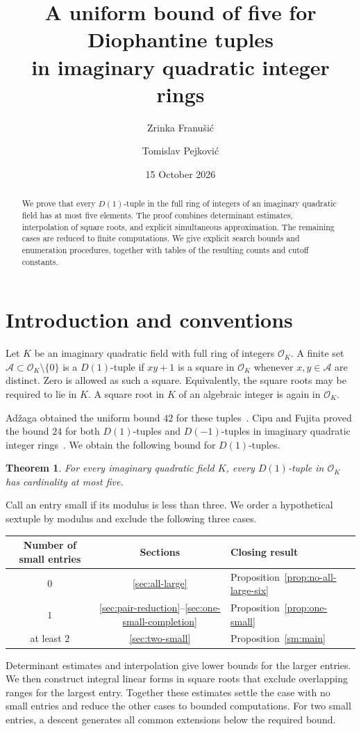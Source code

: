 \documentclass[12pt]{article}
\title{A uniform bound of five for Diophantine tuples\\in imaginary quadratic integer rings}
\author{Zrinka Franu\v{s}i\'{c} \and Tomislav Pejkovi\'{c}}
\date{15 October 2026}
\newtheorem{theorem}{Theorem}[section]
\numberwithin{equation}{section}
\begin{document}
\maketitle
\begin{abstract}
We prove that every $D(1)$-tuple in the full ring of integers of an
imaginary quadratic field has at most five elements. The proof combines
determinant estimates, interpolation of square roots, and explicit
simultaneous approximation. The remaining cases are reduced to finite
computations. We give explicit search bounds and enumeration procedures,
together with tables of the resulting counts and cutoff constants.
\end{abstract}

\section{Introduction and conventions}

Let $K$ be an imaginary quadratic field with full ring of integers
$\mathcal O_K$. A finite set $\mathcal A\subset\mathcal O_K\setminus\{0\}$
is a $D(1)$-tuple if $xy+1$ is a square in $\mathcal O_K$ whenever
$x,y\in\mathcal A$ are distinct. Zero is allowed as such a square.
Equivalently, the square roots may be required to lie in $K$. A square
root in $K$ of an algebraic integer is again in $\mathcal O_K$.

Ad\v zaga obtained the uniform bound $42$ for these tuples~\cite{A}.
Cipu and Fujita proved the bound $24$ for both $D(1)$-tuples and
$D(-1)$-tuples in imaginary quadratic integer rings~\cite{CF}.
We obtain the following bound for $D(1)$-tuples.

\begin{theorem}\label{thm:main}
For every imaginary quadratic field $K$, every $D(1)$-tuple in
$\mathcal O_K$ has cardinality at most five.
\end{theorem}

Call an entry small if its modulus is less than three. We order a
hypothetical sextuple by modulus and exclude the following three cases.
\begin{center}
\begin{tabular}{ccl}
Number of small entries&Sections&Closing result\\\hline
$0$&\ref{sec:all-large}&Proposition~\ref{prop:no-all-large-six}\\
$1$&\ref{sec:pair-reduction}--\ref{sec:one-small-completion}&Proposition~\ref{prop:one-small}\\
at least $2$&\ref{sec:two-small}&Proposition~\ref{sm:main}
\end{tabular}
\end{center}
Determinant estimates and interpolation give lower bounds for the larger
entries. We then construct integral linear forms in square roots that
exclude overlapping ranges for the largest entry. Together these
estimates settle the case with no small entries and reduce the other
cases to bounded computations. For two small entries, a descent generates
all common extensions below the required bound.
\end{document}
